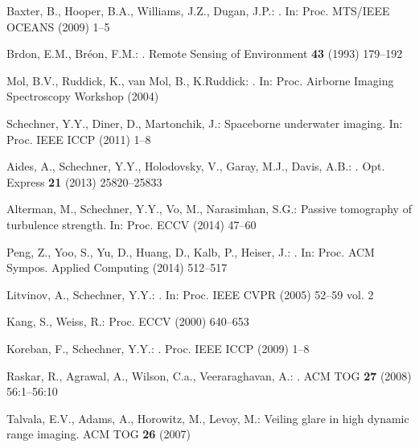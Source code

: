 \documentclass[runningheads]{llncs}
\begin{document}
\begin{thebibliography}{10}
Baxter, B., Hooper, B.A., Williams, J.Z., Dugan, J.P.:
.
\newblock In: Proc. MTS/IEEE OCEANS  (2009)  1--5

Brdon, E.M., Br\'{e}on, F.M.:
.
\newblock Remote Sensing of Environment \textbf{43} (1993)  179--192

Mol, B.V., Ruddick, K., van Mol, B., K.Ruddick:
.
\newblock In: Proc. Airborne Imaging Spectroscopy Workshop  (2004)

Schechner, Y.Y., Diner, D., Martonchik, J.:
\newblock Spaceborne underwater imaging.
\newblock In: Proc. IEEE ICCP  (2011)  1--8

Aides, A., Schechner, Y.Y., Holodovsky, V., Garay, M.J., Davis, A.B.:
.
\newblock Opt. Express \textbf{21} (2013)  25820--25833

Alterman, M., Schechner, Y.Y., Vo, M., Narasimhan, S.G.:
\newblock Passive tomography of turbulence strength.
\newblock In: Proc. ECCV 
\newblock (2014)  47--60

Peng, Z., Yoo, S., Yu, D., Huang, D., Kalb, P., Heiser, J.:
.
\newblock In: Proc. ACM Sympos. Applied Computing (2014)  512--517

Litvinov, A., Schechner, Y.Y.:
.
\newblock In: Proc. IEEE CVPR  (2005)  52--59 vol. 2

Kang, S., Weiss, R.:
\newblock Proc. ECCV (2000)  640--653

Koreban, F., Schechner, Y.Y.:
.
\newblock Proc. IEEE ICCP (2009)  1--8

Raskar, R., Agrawal, A., Wilson, C.a., Veeraraghavan, A.:
.
\newblock ACM TOG \textbf{27} (2008)  56:1--56:10

Talvala, E.V., Adams, A., Horowitz, M., Levoy, M.:
\newblock Veiling glare in high dynamic range imaging.
\newblock ACM TOG \textbf{26} (2007)


\end{thebibliography}
\end{document}
